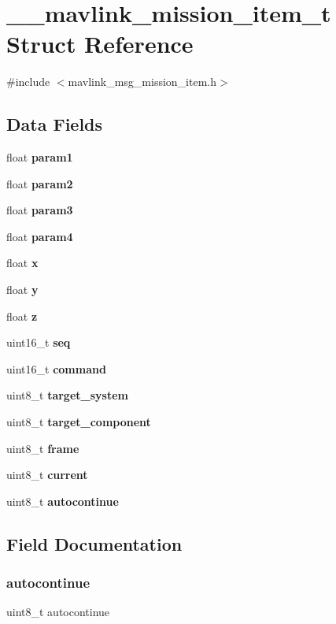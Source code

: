 \section{\+\_\+\+\_\+mavlink\+\_\+mission\+\_\+item\+\_\+t Struct Reference}
\label{struct____mavlink__mission__item__t}


{\ttfamily \#include $<$mavlink\+\_\+msg\+\_\+mission\+\_\+item.\+h$>$}

\subsection*{Data Fields}
\begin{DoxyCompactItemize}
\item 
float \textbf{ param1}
\item 
float \textbf{ param2}
\item 
float \textbf{ param3}
\item 
float \textbf{ param4}
\item 
float \textbf{ x}
\item 
float \textbf{ y}
\item 
float \textbf{ z}
\item 
uint16\+\_\+t \textbf{ seq}
\item 
uint16\+\_\+t \textbf{ command}
\item 
uint8\+\_\+t \textbf{ target\+\_\+system}
\item 
uint8\+\_\+t \textbf{ target\+\_\+component}
\item 
uint8\+\_\+t \textbf{ frame}
\item 
uint8\+\_\+t \textbf{ current}
\item 
uint8\+\_\+t \textbf{ autocontinue}
\end{DoxyCompactItemize}


\subsection{Field Documentation}
\mbox{\label{struct____mavlink__mission__item__t_a452a7419e65a96e39663cde437451882}} 
\subsubsection{autocontinue}
{\footnotesize\ttfamily uint8\+\_\+t autocontinue}

